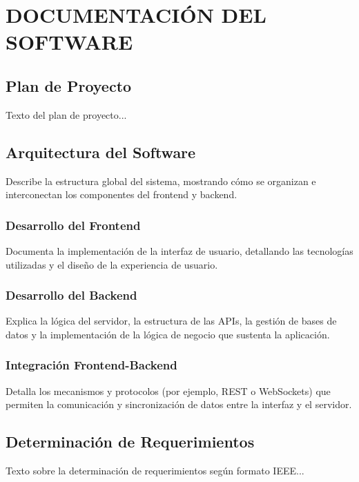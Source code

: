 \chapter{DOCUMENTACIÓN DEL SOFTWARE}


\section{Plan de Proyecto}
Texto del plan de proyecto...


\section{Arquitectura del Software}

Describe la estructura global del sistema, mostrando cómo se organizan e interconectan los componentes del frontend y backend.

\subsection{Desarrollo del Frontend}
Documenta la implementación de la interfaz de usuario, detallando las tecnologías utilizadas y el diseño de la experiencia de usuario.

\subsection{Desarrollo del Backend}
Explica la lógica del servidor, la estructura de las APIs, la gestión de bases de datos y la implementación de la lógica de negocio que sustenta la aplicación.

\subsection{Integración Frontend-Backend}
Detalla los mecanismos y protocolos (por ejemplo, REST o WebSockets) que permiten la comunicación y sincronización de datos entre la interfaz y el servidor.


\section{Determinación de Requerimientos}
Texto sobre la determinación de requerimientos según formato IEEE...


